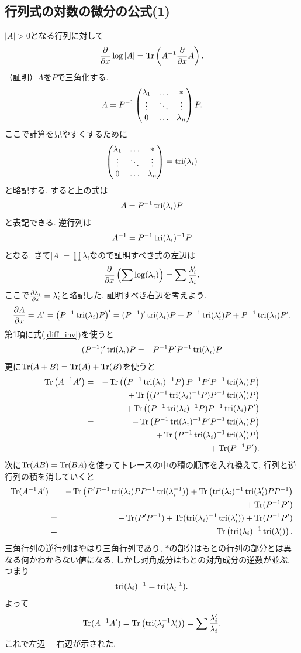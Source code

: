 \subsection{行列式の対数の微分の公式(1)}
$|A|>0$となる行列に対して
$$
\dif{x}\log |A| = \tr\left(A^{-1} \dif{x} A\right).
$$
（証明）$A$を$P$で三角化する.
$$
A=P^{-1}\lmatt{\lambda_1}{*}{0}{\lambda_n}P.
$$
ここで計算を見やすくするために
$$\lmatt{\lambda_1}{*}{0}{\lambda_n}=\tri(\lambda_i)$$
と略記する.
すると上の式は
$$A=P^{-1}\tri(\lambda_i)P$$
と表記できる.
逆行列は
$$A^{-1}=P^{-1}\tri(\lambda_i)^{-1}P$$
となる.
さて$|A|=\prod \lambda_i$なので証明すべき式の左辺は
$$
\dif{x}\left(\sum \log (\lambda_i)\right) = \sum \frac{\lambda_i'}{\lambda_i}.
$$
ここで$\diff{x}{\lambda_i}=\lambda_i'$と略記した.
証明すべき右辺を考えよう.
\pagebreak
$$
\diff{x}{A}
 =A'
 =\left(P^{-1}\tri(\lambda_i)P\right)'
 =(P^{-1})'\tri(\lambda_i)P + P^{-1}\tri(\lambda_i')P + P^{-1}\tri(\lambda_i)P'.
$$
第1項に式(\ref{diff_inv})を使うと
$$
(P^{-1})'\tri(\lambda_i)P=-P^{-1}P'P^{-1}\tri(\lambda_i)P
$$
更に$\tr(A+B)=\tr(A)+\tr(B)$を使うと
\begin{eqnarray*}
\tr\left(A^{-1}A'\right)
 &=& -\tr\left(\left(P^{-1}\tri(\lambda_i)^{-1}P\right)P^{-1}P'P^{-1}\tri(\lambda_i)P\right)\\
 & & +\tr\left((P^{-1}\tri(\lambda_i)^{-1}P)P^{-1}\tri(\lambda_i')P\right)\\
 & & +\tr\left((P^{-1}\tri(\lambda_i)^{-1}P)P^{-1}\tri(\lambda_i)P'\right)\\
 &=& -\tr\left(P^{-1}\tri(\lambda_i)^{-1}P'P^{-1}\tri(\lambda_i)P\right)\\
 & & +\tr\left(P^{-1}\tri(\lambda_i)^{-1}\tri(\lambda_i')P\right)\\
 & & +\tr(P^{-1}P').
\end{eqnarray*}
次に$\tr(AB)=\tr(BA)$を使ってトレースの中の積の順序を入れ換えて,
行列と逆行列の積を消していくと
\begin{eqnarray*}
\tr(A^{-1}A')
 &=& -\tr\left(P'P^{-1}\tri(\lambda_i)PP^{-1}\tri(\lambda_i^{-1})\right)
     +\tr\left(\tri(\lambda_i)^{-1}\tri(\lambda_i')PP^{-1}\right)\\
 & & +\tr(P^{-1}P')\\
 &=&-\tr(P'P^{-1})+\tr(\tri(\lambda_i)^{-1}\tri(\lambda_i'))+\tr(P^{-1}P')\\
 &=&\tr\left(\tri(\lambda_i)^{-1}\tri(\lambda_i')\right).
\end{eqnarray*}
三角行列の逆行列はやはり三角行列であり,
$*$の部分はもとの行列の部分とは異なる何かわからない値になる.
しかし対角成分はもとの対角成分の逆数が並ぶ.
つまり
$$
\tri(\lambda_i)^{-1}=\tri(\lambda_i^{-1}).
$$
よって
$$
\tr(A^{-1}A')
 =\tr\left(\tri(\lambda_i^{-1}\lambda_i')\right)=\sum \frac{\lambda_i'}{\lambda_i}.
$$
これで左辺$=$右辺が示された.

